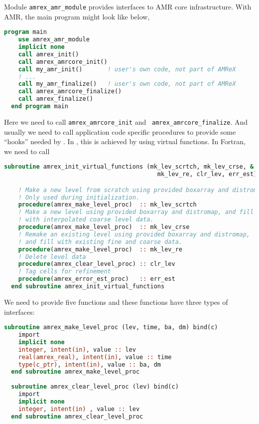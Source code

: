 {Module {\tt amrex\_amr\_module} provides interfaces to AMR core
infrastructure.  With AMR, the main program might look
like below,
\begin{lstlisting}[language=fortran]
  program main
    use amrex_amr_module
    implicit none  
    call amrex_init()
    call amrex_amrcore_init()
    call my_amr_init()       ! user's own code, not part of AMReX
    ! ...
    call my_amr_finalize()   ! user's own code, not part of AMReX
    call amrex_amrcore_finalize()
    call amrex_finalize()
  end program main
\end{lstlisting}
Here we need to call {\tt amrex\_amrcore\_init} and {\tt
  amrex\_amrcore\_finalize}.  And usually we need to call application
code specific procedures to provide some ``hooks'' needed by \amrex.
In \cpp, this is achieved by using virtual functions.  In Fortran, we
need to call
\begin{lstlisting}[language=fortran]
  subroutine amrex_init_virtual_functions (mk_lev_scrtch, mk_lev_crse, &
                                           mk_lev_re, clr_lev, err_est)

    ! Make a new level from scratch using provided boxarray and distromap
    ! Only used during initialization.
    procedure(amrex_make_level_proc)  :: mk_lev_scrtch
    ! Make a new level using provided boxarray and distromap, and fill
    ! with interpolated coarse level data.
    procedure(amrex_make_level_proc)  :: mk_lev_crse
    ! Remake an existing level using provided boxarray and distromap,
    ! and fill with existing fine and coarse data.
    procedure(amrex_make_level_proc)  :: mk_lev_re
    ! Delete level data
    procedure(amrex_clear_level_proc) :: clr_lev
    ! Tag cells for refinement
    procedure(amrex_error_est_proc)   :: err_est
  end subroutine amrex_init_virtual_functions
\end{lstlisting}
We need to provide five functions and these functions have three types
of interfaces:
\begin{lstlisting}[language=fortran]
  subroutine amrex_make_level_proc (lev, time, ba, dm) bind(c)
    import
    implicit none
    integer, intent(in), value :: lev
    real(amrex_real), intent(in), value :: time
    type(c_ptr), intent(in), value :: ba, dm
  end subroutine amrex_make_level_proc
  
  subroutine amrex_clear_level_proc (lev) bind(c)
    import
    implicit none
    integer, intent(in) , value :: lev
  end subroutine amrex_clear_level_proc
  

\end{lstlisting}}
